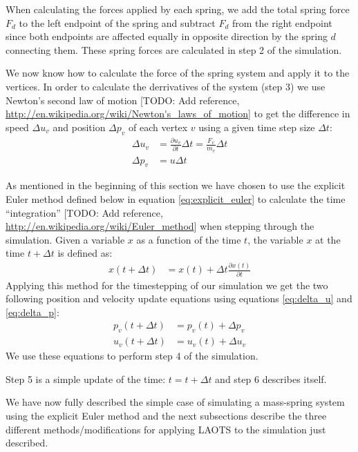 \documentclass[twoside]{article}
\begin{document}
\begin{multicols}{2}
When calculating the forces applied by each spring, we add the total spring
force $F_d$ to the left endpoint of the spring and subtract $F_d$ from the right
endpoint since both endpoints are affected equally in opposite direction by the
spring $d$ connecting them. These spring forces are calculated in step 2 of the
simulation.

We now know how to calculate the force of the spring system and apply
it to the vertices. In order to calculate the derrivatives of the
system (step 3) we use Newton's second law of motion [TODO: Add reference,
\url{http://en.wikipedia.org/wiki/Newton's_laws_of_motion}] to get the
difference in speed $\Delta u_v$ and position $\Delta p_v$ of each vertex $v$ using
a given time step size $\Delta t$:
\begin{align}
    \label{eq:delta_u}
    \Delta u_v &= \frac{\partial u_v}{\partial t} \Delta t = \frac{F_v}{m_v}
    \Delta t \\
    \label{eq:delta_p}
    \Delta p_v &= u \Delta t
\end{align}

As mentioned in the beginning of this section we have chosen to use the
explicit Euler method defined below in equation \ref{eq:explicit_euler}
to calculate the time ``integration'' [TODO: Add reference,
\url{http://en.wikipedia.org/wiki/Euler_method}] when stepping through the
simulation. Given a variable $x$ as a function of the time $t$, the variable $x$
at the time $t + \Delta t$ is defined as:
\begin{align}
    \label{eq:explicit_euler}
    x(t+\Delta t) &= x(t) + \Delta t \frac{\partial x(t)}{\partial t}
\end{align}
Applying this method for the timestepping of our simulation we get the two
following position and velocity update equations using equations
\ref{eq:delta_u} and \ref{eq:delta_p}:
\begin{align}
    p_v(t+\Delta t) &= p_v(t) + \Delta p_v \\
    u_v(t+\Delta t) &= u_v(t) + \Delta u_v
\end{align}
We use these equations to perform step 4 of the simulation.

Step 5 is a simple update of the time: $t = t + \Delta t$ and step 6 describes
itself.

We have now fully described the simple case of simulating a mass-spring system
using the explicit Euler method and the next subsections describe the three
different methods/modifications for applying LAOTS to the simulation just
described.



\end{multicols}
\end{document}
